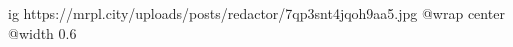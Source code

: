  
 
 
 
 

\ifcmt
  ig https://mrpl.city/uploads/posts/redactor/7qp3snt4jqoh9aa5.jpg
  @wrap center
  @width 0.6
\fi
